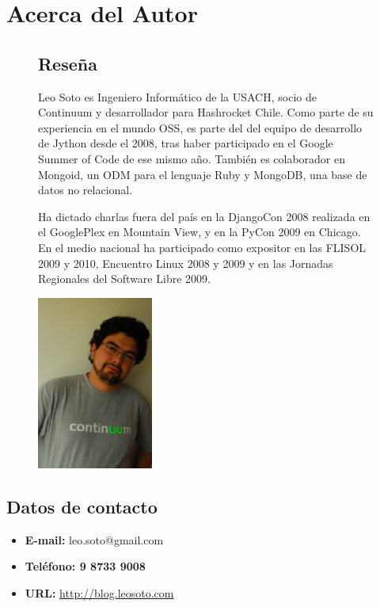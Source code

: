 \section{Acerca del Autor}

\begin{figure}[h]
\begin{minipage}{11.5cm}

\subsection{Reseña}

Leo Soto es Ingeniero Informático de la USACH, socio de Continuum y
desarrollador para Hashrocket Chile. Como parte de su experiencia en el mundo
OSS, es parte del del equipo de desarrollo de Jython desde el 2008, tras haber
participado en el Google Summer of Code de ese mismo año. También es colaborador
en Mongoid, un ODM para el lenguaje Ruby y MongoDB, una base de datos no
relacional.

Ha dictado charlas fuera del país en la DjangoCon 2008 realizada en el
GooglePlex en Mountain View, y en la PyCon 2009 en Chicago. En el medio nacional
ha participado como expositor en las FLISOL 2009 y 2010, Encuentro Linux 2008 y
2009 y en las Jornadas Regionales del Software Libre 2009.

\end{minipage}
\begin{minipage}{1.7in}
\includegraphics[width=1.5in]{images/DSC_0450.JPG}
\end{minipage}
\end{figure}

\subsection{Datos de contacto}

\begin{itemize}
\item{\textbf{E-mail:} leo.soto@gmail.com}
\item\textbf{{Teléfono:} 9 8733 9008}
\item{\textbf{URL:} \url{http://blog.leosoto.com}}
\end{itemize}
